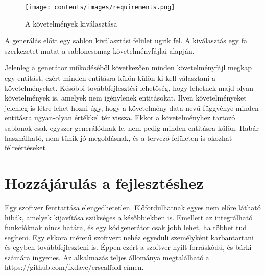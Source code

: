 \documentclass[a4paper,12pt,oneside]{report}
\begin{document}
\newpage

\begin{figure}[H]
	\texttt{[image: contents/images/requirements.png]}
	\caption{A követelmények kiválasztása}
	\label{fig:requirements}
\end{figure}

\begin{justify}
	A generálás előtt egy sablon kiválasztási felület ugrik fel. A kiválasztás egy fa szerkezetet mutat a sabloncsomag követelményfájlai alapján.

	Jelenleg a generátor működéséből következően minden követelményfájl megkap egy entitást, ezért minden entitásra külön-külön ki kell választani a követelményeket. Későbbi továbbfejlesztési lehetőség, hogy lehetnek majd olyan követelmények is, amelyek nem igénylenek entitásokat. Ilyen követelményeket jelenleg is létre lehet hozni úgy, hogy a követelmény data nevű függvénye minden entitásra ugyan-olyan értékkel tér vissza. Ekkor a követelményhez tartozó sablonok csak egyszer generálódnak le, nem pedig minden entitásra külön. Habár használható, nem tűnik jó megoldásnak, és a tervező felületen is okozhat félreértéseket.

\end{justify}

\clearpage
\section{Hozzájárulás a fejlesztéshez}
\begin{justify}
	Egy szoftver fenttartása elengedhetetlen. Előfordulhatnak egyes nem előre látható hibák, amelyek kijavítása szükséges a későbbiekben is. Emellett az integrálható funkcióknak nincs határa, és egy kódgenerátor csak jobb lehet, ha többet tud segíteni. Egy ekkora méretű szoftvert nehéz egyedüli személyként karbantartani és egyben továbbfejleszteni is. Éppen ezért a szoftver nyílt forráskódú, és bárki számára ingyenes. Az alkalmazás teljes állománya megtalálható a https://github.com/fxdave/erscaffold címen.
\end{justify}
\end{document}
